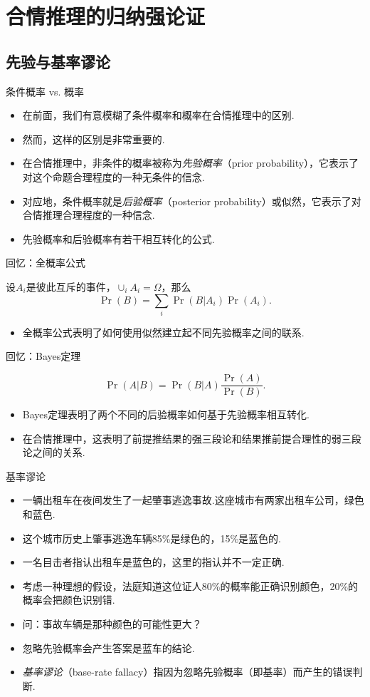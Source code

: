 \section{合情推理的归纳强论证}

\subsection{先验与基率谬论}
{条件概率 vs. 概率}
\begin{itemize}
    \item 在前面，我们有意模糊了条件概率和概率在合情推理中的区别.
    \item 然而，这样的区别是非常重要的.
    \item 在合情推理中，非条件的概率被称为\emph{先验概率}（prior probability），它表示了对这个命题合理程度的一种无条件的信念.
    \item 对应地，条件概率就是\emph{后验概率}（posterior probability）或似然，它表示了对合情推理合理程度的一种信念.
    \item 先验概率和后验概率有若干相互转化的公式.
\end{itemize}

{回忆：全概率公式}
\begin{theorem}[全概率公式]
设$A_i$是彼此互斥的事件，$\cup_i A_i=\Omega$，那么
    \[\Pr(B)=\sum_{i}\Pr(B|A_i)\Pr(A_i).\]
\end{theorem}
\begin{itemize}
    \item 全概率公式表明了如何使用似然建立起不同先验概率之间的联系.
\end{itemize}

{回忆：Bayes定理}
\begin{theorem}[Bayes定理]
    \[\Pr(A|B) = \Pr(B|A)\frac{\Pr(A)}{\Pr(B)}.\]
\end{theorem}
    \begin{itemize}
        \item Bayes定理表明了两个不同的后验概率如何基于先验概率相互转化.
        \item 在合情推理中，这表明了前提推结果的强三段论和结果推前提合理性的弱三段论之间的关系.
    \end{itemize}


{基率谬论}
    \begin{itemize}
        \item 一辆出租车在夜间发生了一起肇事逃逸事故.这座城市有两家出租车公司，绿色和蓝色.
        \item 这个城市历史上肇事逃逸车辆85\%是绿色的，15\%是蓝色的.
        \item 一名目击者指认出租车是蓝色的，这里的指认并不一定正确.
        \item 考虑一种理想的假设，法庭知道这位证人80\%的概率能正确识别颜色，20\%的概率会把颜色识别错.
        \item 问：事故车辆是那种颜色的可能性更大？
        \item 忽略先验概率会产生答案是蓝车的结论.
        \item \emph{基率谬论}（base-rate fallacy）指因为忽略先验概率（即基率）而产生的错误判断.
    \end{itemize}
    


